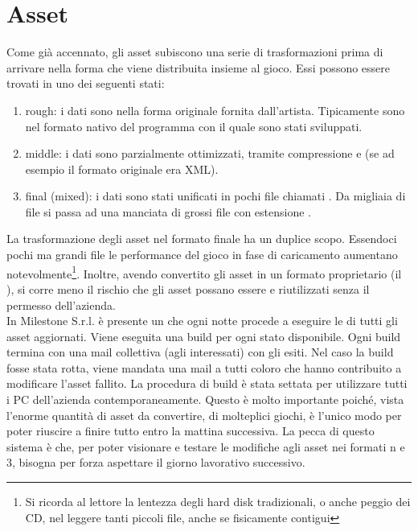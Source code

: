 \section{Asset}
\label{sec:asset}

Come già accennato, gli asset subiscono una serie di trasformazioni prima di arrivare nella forma che viene distribuita insieme al gioco. Essi possono essere trovati in uno dei seguenti stati:
\begin{enumerate}
	\item rough: i dati sono nella forma originale fornita dall'artista. Tipicamente sono nel formato nativo del programma con il quale sono stati sviluppati.
	\item middle: i dati sono parzialmente ottimizzati, tramite compressione e  (se ad esempio il formato originale era XML).
	\item final (mixed): i dati sono stati unificati in pochi file chiamati . Da migliaia di file si passa ad una manciata di grossi file con estensione .
\end{enumerate}

La trasformazione degli asset nel formato finale ha un duplice scopo. Essendoci pochi ma grandi file le performance del gioco in fase di caricamento aumentano notevolmente\footnote{Si ricorda al lettore la lentezza degli hard disk tradizionali, o anche peggio dei CD, nel leggere tanti piccoli file, anche se fisicamente contigui}. Inoltre, avendo convertito gli asset in un formato proprietario (il ), si corre meno il rischio che gli asset possano essere  e riutilizzati senza il permesso dell'azienda.\\

In Milestone S.r.l. è presente un  che ogni notte procede a eseguire le  di tutti gli asset aggiornati. Viene eseguita una build per ogni stato disponibile. Ogni build termina con una mail collettiva (agli interessati) con gli esiti. Nel caso la build fosse stata rotta, viene mandata una mail a tutti coloro che hanno contribuito a modificare l'asset fallito. La procedura di build è stata settata per utilizzare tutti i PC dell'azienda contemporaneamente. Questo è molto importante poiché, vista l'enorme quantità di asset da convertire, di molteplici giochi, è l'unico modo per poter riuscire a finire tutto entro la mattina successiva. La pecca di questo sistema è che, per poter visionare e testare le modifiche agli asset nei formati n e 3, bisogna per forza aspettare il giorno lavorativo successivo.

